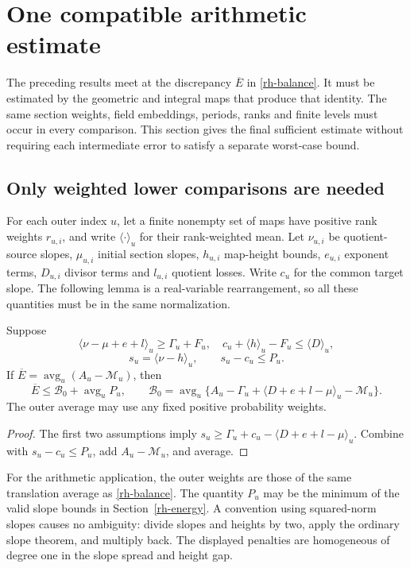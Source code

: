 \section{One compatible arithmetic estimate}
\label{rh-budget}

The preceding results meet at the discrepancy $\overline E$ in
\eqref{rh-balance}. It must be estimated by the geometric and
integral maps that produce that identity. The same section weights,
field embeddings, periods, ranks and finite levels must occur in
every comparison. This section gives the final sufficient estimate
without requiring each intermediate error to satisfy a separate
worst-case bound.

\subsection{Only weighted lower comparisons are needed}

For each outer index $u$, let a finite nonempty set of maps have
positive rank weights $r_{u,i}$, and write $\langle\cdot\rangle_u$
for their rank-weighted mean. Let $\nu_{u,i}$ be quotient-source
slopes, $\mu_{u,i}$ initial section slopes, $h_{u,i}$ map-height
bounds, $e_{u,i}$ exponent terms, $D_{u,i}$ divisor terms and
$l_{u,i}$ quotient losses. Write $c_u$ for the common target slope.
The following lemma is a real-variable rearrangement, so all these
quantities must be in the same normalization.

\begin{lemma}\label{rh-lower-comparison}
Suppose
\[
 \langle\nu-\mu+e+l\rangle_u\ge\Gamma_u+F_u,
 \quad c_u+\langle h\rangle_u-F_u\le\langle D\rangle_u,
\]
\[
 s_u=\langle\nu-h\rangle_u,\qquad s_u-c_u\le P_u.
\]
If $\overline E=\operatorname{avg}_u(A_u-\mathcal M_u)$, then
\begin{equation}\label{rh-nonframe}
 \overline E\le\mathcal B_0+\operatorname{avg}_uP_u,\qquad
 \mathcal B_0=\operatorname{avg}_u
 \{A_u-\Gamma_u+\langle D+e+l-\mu\rangle_u-\mathcal M_u\}.
\end{equation}
The outer average may use any fixed positive probability weights.
\end{lemma}

\begin{proof}
The first two assumptions imply
$s_u\ge\Gamma_u+c_u-\langle D+e+l-\mu\rangle_u$.
Combine with $s_u-c_u\le P_u$, add $A_u-\mathcal M_u$, and average.
\end{proof}

For the arithmetic application, the outer weights are those of the
same translation average as \eqref{rh-balance}. The quantity $P_u$
may be the minimum of the valid slope bounds in
Section~\ref{rh-energy}. A convention using squared-norm slopes
causes no ambiguity: divide slopes and heights by two, apply the
ordinary slope theorem, and multiply back. The displayed penalties
are homogeneous of degree one in the slope spread and height gap.

